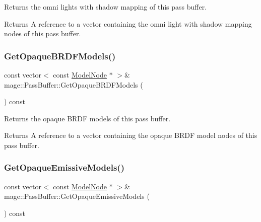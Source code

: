Returns the omni lights with shadow mapping of this pass buffer.

\begin{DoxyReturn}{Returns}
A reference to a vector containing the omni light with shadow mapping nodes of this pass buffer. 
\end{DoxyReturn}
\hypertarget{structmage_1_1_pass_buffer_a75539c1d2349b864b54495c9757ada74}{}\label{structmage_1_1_pass_buffer_a75539c1d2349b864b54495c9757ada74} 
\subsubsection{\texorpdfstring{Get\+Opaque\+B\+R\+D\+F\+Models()}{GetOpaqueBRDFModels()}}
{\footnotesize\ttfamily const vector$<$ const \hyperlink{classmage_1_1_model_node}{Model\+Node} $\ast$ $>$\& mage\+::\+Pass\+Buffer\+::\+Get\+Opaque\+B\+R\+D\+F\+Models (\begin{DoxyParamCaption}{ }\end{DoxyParamCaption}) const\hspace{0.3cm}{\ttfamily [noexcept]}}

Returns the opaque B\+R\+DF models of this pass buffer.

\begin{DoxyReturn}{Returns}
A reference to a vector containing the opaque B\+R\+DF model nodes of this pass buffer. 
\end{DoxyReturn}
\hypertarget{structmage_1_1_pass_buffer_a1fcbb01cc67df0152046ceb2c9133b9a}{}\label{structmage_1_1_pass_buffer_a1fcbb01cc67df0152046ceb2c9133b9a} 
\subsubsection{\texorpdfstring{Get\+Opaque\+Emissive\+Models()}{GetOpaqueEmissiveModels()}}
{\footnotesize\ttfamily const vector$<$ const \hyperlink{classmage_1_1_model_node}{Model\+Node} $\ast$ $>$\& mage\+::\+Pass\+Buffer\+::\+Get\+Opaque\+Emissive\+Models (\begin{DoxyParamCaption}{ }\end{DoxyParamCaption}) const\hspace{0.3cm}{\ttfamily [noexcept]}}

